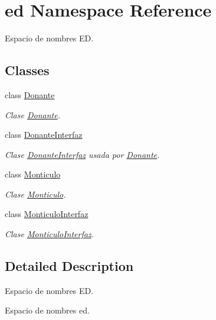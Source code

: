 \hypertarget{namespaceed}{}\section{ed Namespace Reference}
\label{namespaceed}


Espacio de nombres ED.  


\subsection*{Classes}
\begin{DoxyCompactItemize}
\item 
class \hyperlink{classed_1_1Donante}{Donante}
\begin{DoxyCompactList}\small\item\em Clase \hyperlink{classed_1_1Donante}{Donante}. \end{DoxyCompactList}\item 
class \hyperlink{classed_1_1DonanteInterfaz}{Donante\+Interfaz}
\begin{DoxyCompactList}\small\item\em Clase \hyperlink{classed_1_1DonanteInterfaz}{Donante\+Interfaz} usada por \hyperlink{classed_1_1Donante}{Donante}. \end{DoxyCompactList}\item 
class \hyperlink{classed_1_1Monticulo}{Monticulo}
\begin{DoxyCompactList}\small\item\em Clase \hyperlink{classed_1_1Monticulo}{Monticulo}. \end{DoxyCompactList}\item 
class \hyperlink{classed_1_1MonticuloInterfaz}{Monticulo\+Interfaz}
\begin{DoxyCompactList}\small\item\em Clase \hyperlink{classed_1_1MonticuloInterfaz}{Monticulo\+Interfaz}. \end{DoxyCompactList}\end{DoxyCompactItemize}


\subsection{Detailed Description}
Espacio de nombres ED. 

Espacio de nombres ed. 
